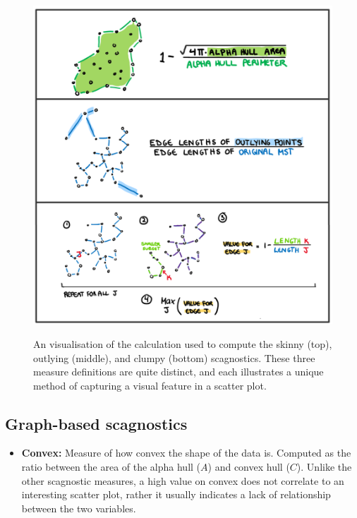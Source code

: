 \begin{figure}
\includegraphics[width=1\linewidth,alt={A hand drawn illustration showing the algorithm of the skinny, outlying and clumpy calculations. In each drawing the edges used in the calculation are highlighted in both the mathematical formula and in the illustration of the scatter plot.}]{figures/drawnmeasures} \caption{ An visualisation of the calculation used to compute the skinny (top), outlying (middle), and clumpy (bottom) scagnostics. These three measure definitions are quite distinct, and each illustrates a unique method of capturing a visual feature in a scatter plot.}\label{fig:scagdrawn}
\end{figure}

\subsection{Graph-based scagnostics}\label{graph-based-scagnostics}

\begin{itemize}
\tightlist
\item
  \textbf{Convex:} Measure of how convex the shape of the data is. Computed as the ratio between the area of the alpha hull (\(A\)) and convex hull (\(C\)). Unlike the other scagnostic measures, a high value on convex does not correlate to an interesting scatter plot, rather it usually indicates a lack of relationship between the two variables.
\end{itemize}

